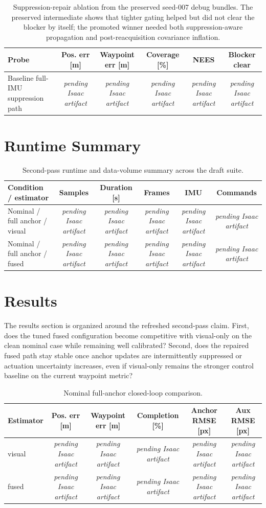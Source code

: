 \documentclass[11pt]{article}
\newcommand{\ArtifactPending}{\textit{pending Isaac artifact}}
\newcommand{\IsaacSecondPassRuntimeRows}{%
Nominal / full anchor / visual & \ArtifactPending{} & \ArtifactPending{} & \ArtifactPending{} & \ArtifactPending{} & \ArtifactPending{} \\
Nominal / full anchor / fused & \ArtifactPending{} & \ArtifactPending{} & \ArtifactPending{} & \ArtifactPending{} & \ArtifactPending{} \\
}
\newcommand{\IsaacSecondPassNominalRows}{%
visual & \ArtifactPending{} & \ArtifactPending{} & \ArtifactPending{} & \ArtifactPending{} & \ArtifactPending{} \\
fused & \ArtifactPending{} & \ArtifactPending{} & \ArtifactPending{} & \ArtifactPending{} & \ArtifactPending{} \\
}
\newcommand{\IsaacSecondPassSuppressionAblationRows}{%
Baseline full-IMU suppression path & \ArtifactPending{} & \ArtifactPending{} & \ArtifactPending{} & \ArtifactPending{} & \ArtifactPending{} \\
}
\begin{document}
\begin{table}[H]
\centering
\caption{Suppression-repair ablation from the preserved seed-007 debug bundles. The preserved intermediate shows that tighter gating helped but did not clear the blocker by itself; the promoted winner needed both suppression-aware propagation and post-reacquisition covariance inflation.}
\begin{tabular}{lccccc}
\toprule
Probe & Pos. err [m] & Waypoint err [m] & Coverage [\%] & NEES & Blocker clear \\
\midrule
\IsaacSecondPassSuppressionAblationRows
\bottomrule
\end{tabular}
\end{table}

\section{Runtime Summary}
\begin{table}[H]
\centering
\caption{Second-pass runtime and data-volume summary across the draft suite.}
\begin{tabular}{lccccc}
\toprule
Condition / estimator & Samples & Duration [s] & Frames & IMU & Commands \\
\midrule
\IsaacSecondPassRuntimeRows
\bottomrule
\end{tabular}
\end{table}

\section{Results}
The results section is organized around the refreshed second-pass claim. First, does the tuned fused configuration become competitive with visual-only on the clean nominal case while remaining well calibrated? Second, does the repaired fused path stay stable once anchor updates are intermittently suppressed or actuation uncertainty increases, even if visual-only remains the stronger control baseline on the current waypoint metric?

\begin{table}[H]
\centering
\caption{Nominal full-anchor closed-loop comparison.}
\begin{tabular}{lccccc}
\toprule
Estimator & Pos. err [m] & Waypoint err [m] & Completion [\%] & Anchor RMSE [px] & Aux RMSE [px] \\
\midrule
\IsaacSecondPassNominalRows
\bottomrule
\end{tabular}
\end{table}
\end{document}
